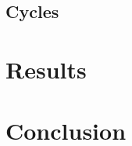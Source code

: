 \documentclass[twocolumn]{svjour3}[2016]
\begin{document}
\subsection{Cycles}

\section{Results}

\section{Conclusion}



\end{document}
